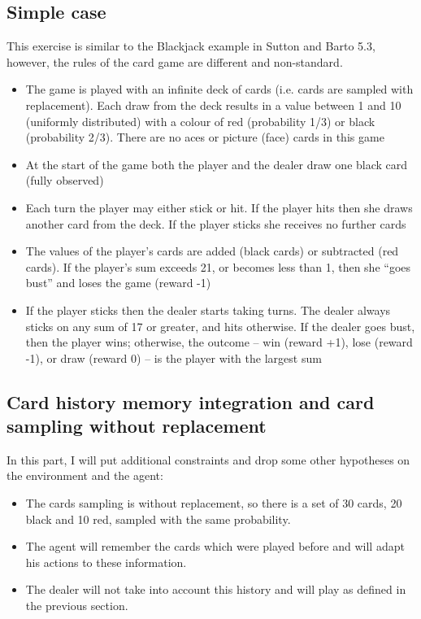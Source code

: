 \documentclass[12pt,a4paper]{article}
\begin{document}
\subsection{Simple case}
This exercise is similar to the Blackjack
example in Sutton and Barto 5.3, however, the rules of the
card game are different and non-standard.
\begin{itemize}
\item The game is played with an infinite deck of cards (i.e. cards are sampled
with replacement). Each draw from the deck results in a value between 1 and 10 (uniformly
distributed) with a colour of red (probability 1/3) or black (probability
2/3). There are no aces or picture (face) cards in this game
\item At the start of the game both the player and the dealer draw one black
card (fully observed)
\item Each turn the player may either stick or hit. If the player hits then she draws another card from the deck. If the player sticks she receives no further cards
\item The values of the player’s cards are added (black cards) or subtracted (red
cards). If the player’s sum exceeds 21, or becomes less than 1, then she “goes
bust” and loses the game (reward -1)
\item If the player sticks then the dealer starts taking turns. The dealer always
sticks on any sum of 17 or greater, and hits otherwise. If the dealer goes
bust, then the player wins; otherwise, the outcome – win (reward +1),
lose (reward -1), or draw (reward 0) – is the player with the largest sum
\end{itemize}
 
\subsection{Card history memory integration and card sampling without replacement}
In this part, I will put additional constraints and drop some other hypotheses on the environment and the agent: 
 
\begin{itemize}
\item The cards sampling is without replacement, so there is a set of 30 cards, 20 black and 10 red, sampled with the same probability.
\item The agent will remember the cards which were played before and will adapt his actions to these information.
\item The dealer will not take into account this history and will play as defined in the previous section.
\end{itemize}
\newpage
\end{document}
